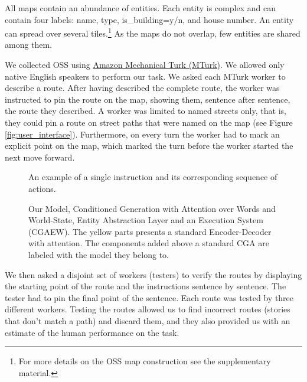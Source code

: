 \documentclass[11pt,a4paper]{article}
\begin{document}
All maps contain an abundance of entities.
Each entity is complex and can contain four labels: name, type, is\_building=y/n, and house number. An entity can spread over several tiles.\footnote{For more details on the OSS map construction see the supplementary  material.} 
As the maps do not overlap, few entities are shared among them. 

We collected OSS  using
\href{https://www.mturk.com/}{Amazon Mechanical Turk (MTurk)}.
We allowed only native English speakers to perform our task. 
We asked each MTurk worker to describe a route. After having described the complete route, the worker was instructed to pin the route on the map, showing them, sentence after sentence, the route they described. A worker was limited to named  streets only, that is, they could pin a route on street paths that were named on the map (see Figure \ref{fig:user_interface}). Furthermore, on every turn the worker had to mark an explicit point on the map, which marked the turn before the worker started the next move forward.


 
 \begin{figure}[ht]

  \center
{}
         
        \caption
        {An example of a single instruction and its corresponding sequence of actions.} 
        \label{fig:action_example}
    \end{figure}



\begin{figure*}[t]
\centering
{}
 \caption{Our Model, Conditioned Generation with Attention over Words and World-State, Entity Abstraction Layer and an Execution System (CGAEW). The yellow parts presents a standard Encoder-Decoder with attention. The components added above a standard CGA are labeled with the model they belong to.}
\label{fig:model}
\end{figure*}




We then asked a disjoint set of workers (testers) to verify the routes by displaying the starting point of the route and the instructions sentence by sentence. The tester had to pin the final point of the sentence. Each route was tested by three different workers. Testing the routes allowed us to find incorrect routes (stories that don't match a path) and discard them, and they also   provided us with an estimate of  the human performance on the  task.  %
\end{document}
